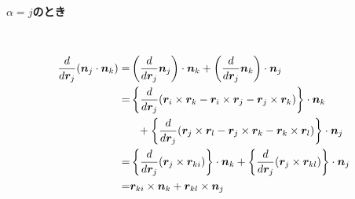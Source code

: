 \paragraph{$\alpha = j$のとき} \
\begin{align}
    \frac{d} {d \bm{r}_{j}} (\bm{n}_{j} \cdot \bm{n}_{k})
 =&
      \left( \frac{d}{d \bm{r}_{j}} \bm{n}_{j} \right) \cdot \bm{n}_{k}
    + \left( \frac{d}{d \bm{r}_{j}} \bm{n}_{k} \right) \cdot \bm{n}_{j}
 \notag
 \\
 =&
    \left\{
            \frac{d} {d \bm{r}_{j}}
            (  \bm{r}_{i} \times \bm{r}_{k}
             - \bm{r}_{i} \times \bm{r}_{j}
             - \bm{r}_{j} \times \bm{r}_{k}
             )
    \right\} \cdot \bm{n}_{k}
 \notag
 \\
 &~~
 + 
    \left\{
            \frac{d} {d \bm{r}_{j}}
           (  \bm{r}_{j} \times \bm{r}_{l}
            - \bm{r}_{j} \times \bm{r}_{k}
            - \bm{r}_{k} \times \bm{r}_{l}
            ) 
   \right\} \cdot \bm{n}_{j}
 \notag
 \\
 =&
   \left\{
          \frac{d}{d \bm{r}_{j}}
          (\bm{r}_{j} \times \bm{r}_{ki})
   \right\} \cdot \bm{n}_{k}
  +
   \left\{
          \frac{d}{d \bm{r}_{j}}
          (\bm{r}_{j} \times \bm{r}_{kl})
   \right\} \cdot \bm{n}_{j}
 \notag
 \\
 =&
   \bm{r}_{ki} \times \bm{n}_{k} + \bm{r}_{kl} \times \bm{n}_{j}
 \notag
\end{align}

